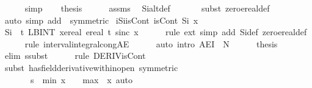\documentclass{article}
\theoremstyle{definition}
\begin{document}
\begin{isabellebody}
\ \ \ \ \isamarkupfalse%
\ simp\isanewline
\ \ \isamarkupfalse%
\ {\isacharquery}thesis\isanewline
\ \ \ \ \isamarkupfalse%
\ assms\ \isamarkupfalse%
\ Si{\isacharunderscore}alt{\isacharunderscore}def\isanewline
\ \ \ \ \ \isamarkupfalse%
\ {\isacharparenleft}subst\ zero{\isacharunderscore}ereal{\isacharunderscore}def{\isacharparenright}{\isacharplus}\isanewline
\ \ \ \ \ \isamarkupfalse%
\ {\isacharparenleft}auto\ simp\ add{\isacharcolon}\ {\isacharasterisk}\ {\isacharbrackleft}symmetric{\isacharbrackright}{\isacharparenright}\isanewline
{}\isamarkupfalse%
\isanewline
\isanewline
\isanewline
{}\isamarkupfalse%
\ iSi{\isacharunderscore}isCont{\isacharcolon}\ {\isachardoublequoteopen}isCont\ Si\ x{\isachardoublequoteclose}\isanewline
{}\isamarkupfalse%
\ {\isacharminus}\isanewline
\ \ \isamarkupfalse%
\ {\isachardoublequoteopen}Si\ {\isacharequal}\ {\isacharparenleft}{\isasymlambda}t{\isachardot}\ LBINT\ x{\isacharequal}ereal\ {}{\isachardot}{\isachardot}ereal\ t{\isachardot}\ sinc\ x{\isacharparenright}{\isachardoublequoteclose}\isanewline
\ \ \ \ \isamarkupfalse%
\ {\isacharparenleft}rule\ ext{\isacharcomma}\ simp\ add{\isacharcolon}\ Si{\isacharunderscore}def\ zero{\isacharunderscore}ereal{\isacharunderscore}def{\isacharparenright}\isanewline
\ \ \ \ \isamarkupfalse%
\ {\isacharparenleft}rule\ interval{\isacharunderscore}integral{\isacharunderscore}cong{\isacharunderscore}AE{\isacharparenright}\isanewline
\ \ \ \ \isamarkupfalse%
\ {\isacharparenleft}auto\ intro{\isacharbang}{\isacharcolon}\ AE{\isacharunderscore}I{\isacharprime}\ {\isacharbrackleft}\ N\ {\isacharequal}\ {\isachardoublequoteopen}{\isacharbraceleft}{}{\isacharbraceright}{\isachardoublequoteclose}{\isacharbrackright}{\isacharparenright}\isanewline
\ \ \isamarkupfalse%
\ {\isacharquery}thesis\isanewline
\ \ \ \ \isamarkupfalse%
\ {\isacharparenleft}elim\ ssubst{\isacharparenright}\isanewline
\ \ \ \ \isamarkupfalse%
\ {\isacharparenleft}rule\ DERIV{\isacharunderscore}isCont{\isacharparenright}\isanewline
\ \ \ \ \isamarkupfalse%
\ {\isacharparenleft}subst\ has{\isacharunderscore}field{\isacharunderscore}derivative{\isacharunderscore}within{\isacharunderscore}open\ {\isacharbrackleft}symmetric{\isacharcomma}\ \isanewline
\ \ \ \ \ \ \ s\ {\isacharequal}\ {\isachardoublequoteopen}{\isacharbraceleft}{\isacharparenleft}min\ {\isacharparenleft}x\ {\isacharminus}\ {}{\isacharparenright}\ {\isacharparenleft}{\isacharminus}\ {}{\isacharparenright}{\isacharparenright}{\isacharless}{\isachardot}{\isachardot}{\isacharless}{\isacharparenleft}max\ {}\ {\isacharparenleft}x{\isacharplus}{}{\isacharparenright}{\isacharparenright}{\isacharbraceright}{\isachardoublequoteclose}{\isacharbrackright}{\isacharcomma}\ auto{\isacharparenright}\isanewline

\end{isabellebody}
\end{document}
